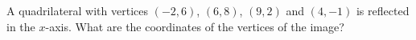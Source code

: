 A quadrilateral with vertices $(-2,6)$, $(6,8)$, $(9,2)$ and $(4,-1)$ is reflected in the $x$-axis. What are the coordinates of the vertices of the image?
